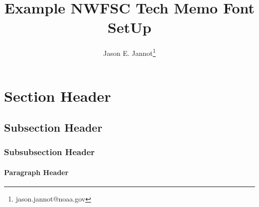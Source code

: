 \documentclass[12pt]{article}
\title{\textcolor[cmyk]{1.00,0.83,0.41,0.36}{Example NWFSC Tech Memo Font SetUp}}
\author{Jason E. Jannot\footnote{jason.jannot@noaa.gov}}
\begin{document}
\maketitle
\selectfont
\normalsize


\section{Section Header}
\lipsum[1]
\subsection{Subsection Header}
\lipsum[2]
\subsubsection{Subsubsection Header}
\lipsum[3]
\paragraph{Paragraph Header}
\lipsum[4]
\end{document}
